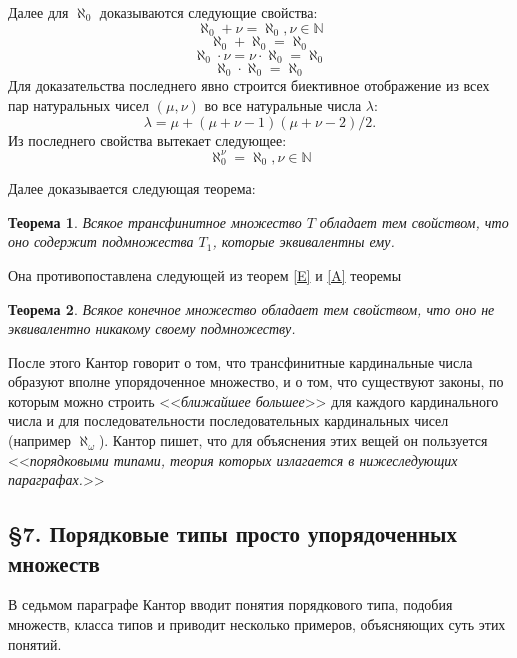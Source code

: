 \documentclass[a4paper,12pt]{extarticle}
\newtheorem{theorem}{Теорема}[subsection]
\theoremstyle{definition}
\newcommand{\cit}[1]{<<\textit{#1}>>}
\begin{document}
Далее для $\aleph_0$ доказываются следующие свойства:
$$ \aleph_0 + \nu = \aleph_0, \nu \in \mathbb{N} $$
$$ \aleph_0 + \aleph_0 = \aleph_0 $$
$$ \aleph_0 \cdot \nu = \nu \cdot \aleph_0 = \aleph_0 $$
$$ \aleph_0 \cdot \aleph_0 = \aleph_0 $$
Для доказательства последнего явно строится биективное отображение из всех пар натуральных чисел $(\mu, \nu)$ во все натуральные числа $\lambda$:
$$ \lambda = \mu + (\mu + \nu - 1)(\mu + \nu - 2)/2. $$
Из последнего свойства вытекает следующее:
$$ \aleph_0^{\nu} = \aleph_0, \nu \in \mathbb{N} $$

Далее доказывается следующая теорема:
\begin{theorem}
    Всякое трансфинитное множество $T$ обладает тем свойством, что оно содержит подмножества $T_1$, которые эквивалентны ему.
\end{theorem}
Она противопоставлена следующей из теорем \ref{E} и \ref{A} теоремы
\begin{theorem}
    Всякое конечное множество обладает тем свойством, что оно не эквивалентно никакому своему подмножеству.
\end{theorem}

После этого Кантор говорит о том, что трансфинитные кардинальные числа образуют вполне упорядоченное множество,
и о том, что существуют законы, по которым можно строить \cit{ближайшее большее} для каждого кардинального числа и
для последовательности последовательных кардинальных чисел (например $\aleph_{\omega}$).
Кантор пишет, что для объяснения этих вещей он пользуется \cit{порядковыми типами,
теория которых излагается в нижеследующих параграфах.}

\subsection{\S 7. Порядковые типы просто упорядоченных множеств}
В седьмом параграфе Кантор вводит понятия порядкового типа, подобия множеств, класса типов и приводит несколько примеров, объясняющих суть этих понятий.
\end{document}
